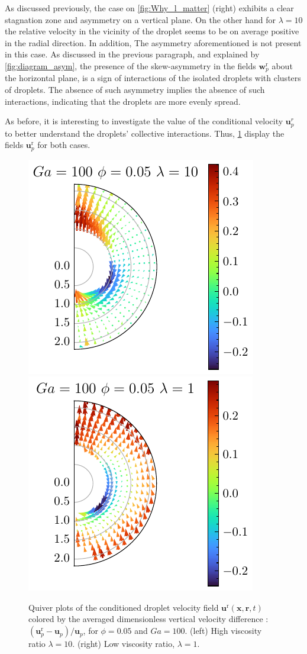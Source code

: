 As discussed previously, the case on \ref{fig:Why_l_matter} (right) exhibits a clear stagnation zone and asymmetry on a vertical plane. 
On the other hand for $\lambda =10$ the relative velocity in the vicinity of the droplet seems to be on average positive in the radial direction. 
In addition, The asymmetry aforementioned is not present in this case. 
As discussed in the previous paragraph, and explained by \ref{fig:diagram_asym}, the presence of the skew-asymmetry in the fields $\textbf{w}_p^\text{r}$ about the horizontal plane, is a sign of interactions of the isolated droplets with clusters of droplets.
The absence of such asymmetry implies the absence of such interactions, indicating that the droplets are more evenly spread. 

As before, it is interesting to investigate the value of the conditional velocity $\textbf{u}^r_p$ to better understand the droplets' collective interactions. 
Thus, \ref{fig:unst_l} display the fields  $\textbf{u}_p^\text{r}$ for both cases. 
\begin{figure}[h!]
    \centering
    \includegraphics[height=0.35\textwidth]{image/HOMOGENEOUS_NEW/Dist/U_l_10_Ga_100_PHI_5.pdf}
    \includegraphics[height=0.35\textwidth]{image/HOMOGENEOUS_NEW/Dist/U_l_1_Ga_100_PHI_5.pdf}
    \caption{
         Quiver plots of the conditioned droplet velocity field $\textbf{u}^\text{r}(\textbf{x},\textbf{r},t)$ colored by the averaged dimensionless vertical velocity difference : $(\textbf{u}^\text{r}_p - \textbf{u}_p )/ \textbf{u}_p$, for $\phi = 0.05$ and $Ga = 100$. 
         (left) High viscosity ratio $\lambda = 10$.
         (right) Low viscosity ratio, $\lambda = 1$.
         }
    \label{fig:unst_l}
\end{figure}
